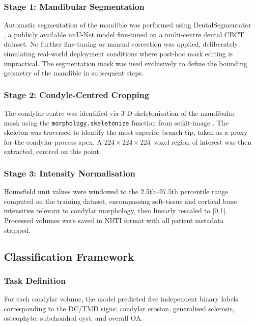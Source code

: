 \documentclass[review,12pt]{elsarticle}
\begin{document}
\subsubsection{Stage 1: Mandibular Segmentation}

Automatic segmentation of the mandible was performed using
DentalSegmentator \cite{dot2024dentalsegmentator}, a publicly available
nnU-Net \cite{isensee2021nnu} model fine-tuned on a multi-centre dental
CBCT dataset. No further fine-tuning or manual correction was applied,
deliberately simulating real-world deployment conditions where post-hoc
mask editing is impractical. The segmentation mask was used exclusively
to define the bounding geometry of the mandible in subsequent steps.

\subsubsection{Stage 2: Condyle-Centred Cropping}

The condylar centre was identified via 3-D skeletonisation of the
mandibular mask using the \texttt{morphology.skeletonize} function from
scikit-image \cite{van2014scikit}. The skeleton was traversed to identify
the most superior branch tip, taken as a proxy for the condylar process
apex. A $224 \times 224 \times 224$~voxel region of interest was then
extracted, centred on this point.

\subsubsection{Stage 3: Intensity Normalisation}

Hounsfield unit values were windowed to the 2.5th–97.5th percentile range computed on the training dataset, encompassing soft-tissue and cortical bone intensities relevant to condylar morphology, then linearly rescaled to [0,1]. Processed volumes were saved in NIfTI format with all patient metadata stripped.

\subsection{Classification Framework}
\label{sec:framework}

\subsubsection{Task Definition}

For each condylar volume, the model predicted five independent binary labels corresponding to the DC/TMD signs: condylar erosion, generalised sclerosis, osteophyte, subchondral cyst, and overall OA.
\end{document}
